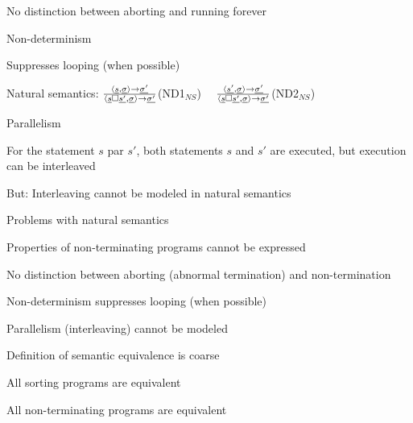 		\item No distinction between aborting and running forever
	\enumend
	\item Non-determinism
	\enumstart
		\item Suppresses looping (when possible)
		\item Natural semantics: $\frac{\langle \underline{s}, \underline{\sigma} \rangle \rightarrow \underline{\sigma'}}{\langle \underline{s} \square \underline{s'}, \underline{\sigma} \rangle \rightarrow \underline{\sigma'}}$(ND1$_{NS}$) $\ \ \ $ $\frac{\langle \underline{s'}, \underline{\sigma} \rangle \rightarrow \underline{\sigma'}}{\langle \underline{s} \square \underline{s'}, \underline{\sigma} \rangle \rightarrow \underline{\sigma'}}$(ND2$_{NS}$)
	\enumend
	\item Parallelism
	\enumstart
		\item For the statement $s$ par $s'$, both statements $s$ and $s'$ are executed, but execution can be interleaved
		\item But: Interleaving cannot be modeled in natural semantics
	\enumend
	\item Problems with natural semantics
	\enumstart
		\item Properties of non-terminating programs cannot be expressed
		\item No distinction between aborting (abnormal termination) and non-termination
		\item Non-determinism suppresses looping (when possible)
		\item Parallelism (interleaving) cannot be modeled
		\item Definition of semantic equivalence is coarse
		\enumstart
			\item All sorting programs are equivalent
			\item All non-terminating programs are equivalent
		\enumend
	\enumend
\enumend